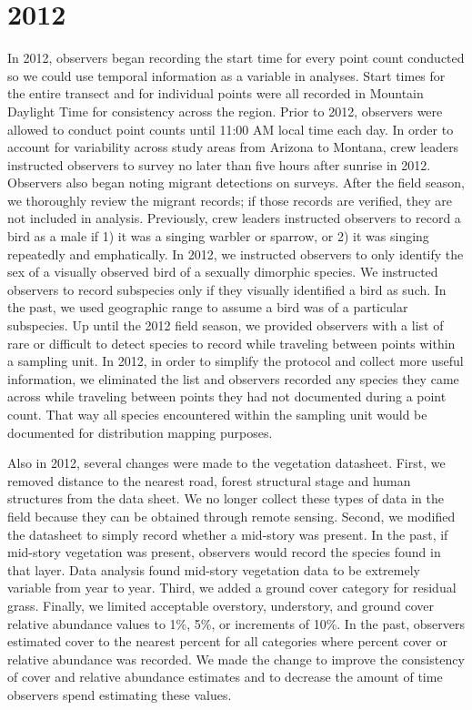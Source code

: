 \documentclass[
  letterpaper,
  DIV=11,
  numbers=noendperiod,
  oneside]{scrreprt}
\begin{document}
\hypertarget{section-14}{%
\section*{2012}\label{section-14}}


In 2012, observers began recording the start time for every point count
conducted so we could use temporal information as a variable in
analyses. Start times for the entire transect and for individual points
were all recorded in Mountain Daylight Time for consistency across the
region. Prior to 2012, observers were allowed to conduct point counts
until 11:00 AM local time each day. In order to account for variability
across study areas from Arizona to Montana, crew leaders instructed
observers to survey no later than five hours after sunrise in 2012.
Observers also began noting migrant detections on surveys. After the
field season, we thoroughly review the migrant records; if those records
are verified, they are not included in analysis. Previously, crew
leaders instructed observers to record a bird as a male if 1) it was a
singing warbler or sparrow, or 2) it was singing repeatedly and
emphatically. In 2012, we instructed observers to only identify the sex
of a visually observed bird of a sexually dimorphic species. We
instructed observers to record subspecies only if they visually
identified a bird as such. In the past, we used geographic range to
assume a bird was of a particular subspecies. Up until the 2012 field
season, we provided observers with a list of rare or difficult to detect
species to record while traveling between points within a sampling unit.
In 2012, in order to simplify the protocol and collect more useful
information, we eliminated the list and observers recorded any species
they came across while traveling between points they had not documented
during a point count. That way all species encountered within the
sampling unit would be documented for distribution mapping purposes.

Also in 2012, several changes were made to the vegetation datasheet.
First, we removed distance to the nearest road, forest structural stage
and human structures from the data sheet. We no longer collect these
types of data in the field because they can be obtained through remote
sensing. Second, we modified the datasheet to simply record whether a
mid-story was present. In the past, if mid-story vegetation was present,
observers would record the species found in that layer. Data analysis
found mid-story vegetation data to be extremely variable from year to
year. Third, we added a ground cover category for residual grass.
Finally, we limited acceptable overstory, understory, and ground cover
relative abundance values to 1\%, 5\%, or increments of 10\%. In the
past, observers estimated cover to the nearest percent for all
categories where percent cover or relative abundance was recorded. We
made the change to improve the consistency of cover and relative
abundance estimates and to decrease the amount of time observers spend
estimating these values.
\end{document}
